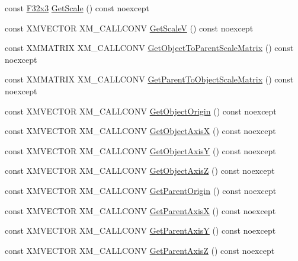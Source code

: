 \begin{DoxyCompactItemize}
\item 
const \hyperlink{namespacemage_a73fbe0da4b8d5bc156bb8453e5b63a17}{F32x3} \hyperlink{classmage_1_1_local_transform_a5dbf74dae200448b0993504d23f99f1c}{Get\+Scale} () const noexcept
\item 
const X\+M\+V\+E\+C\+T\+OR X\+M\+\_\+\+C\+A\+L\+L\+C\+O\+NV \hyperlink{classmage_1_1_local_transform_a6c70ee804326d0b5ff54d282630972bc}{Get\+ScaleV} () const noexcept
\item 
const X\+M\+M\+A\+T\+R\+IX X\+M\+\_\+\+C\+A\+L\+L\+C\+O\+NV \hyperlink{classmage_1_1_local_transform_acd4fda032325f52cb668fc4733c6bc04}{Get\+Object\+To\+Parent\+Scale\+Matrix} () const noexcept
\item 
const X\+M\+M\+A\+T\+R\+IX X\+M\+\_\+\+C\+A\+L\+L\+C\+O\+NV \hyperlink{classmage_1_1_local_transform_a81ef828c64270716e5095f2cf571fad7}{Get\+Parent\+To\+Object\+Scale\+Matrix} () const noexcept
\item 
const X\+M\+V\+E\+C\+T\+OR X\+M\+\_\+\+C\+A\+L\+L\+C\+O\+NV \hyperlink{classmage_1_1_local_transform_abaa858e23864984b339b2fa26607c026}{Get\+Object\+Origin} () const noexcept
\item 
const X\+M\+V\+E\+C\+T\+OR X\+M\+\_\+\+C\+A\+L\+L\+C\+O\+NV \hyperlink{classmage_1_1_local_transform_a369350f17dbf41afa8278643bb641125}{Get\+Object\+AxisX} () const noexcept
\item 
const X\+M\+V\+E\+C\+T\+OR X\+M\+\_\+\+C\+A\+L\+L\+C\+O\+NV \hyperlink{classmage_1_1_local_transform_accd789cb8a8f3cec2c048cfb05ef8eb3}{Get\+Object\+AxisY} () const noexcept
\item 
const X\+M\+V\+E\+C\+T\+OR X\+M\+\_\+\+C\+A\+L\+L\+C\+O\+NV \hyperlink{classmage_1_1_local_transform_a4a7a5e9b38ad3016a9f4db5c46cca782}{Get\+Object\+AxisZ} () const noexcept
\item 
const X\+M\+V\+E\+C\+T\+OR X\+M\+\_\+\+C\+A\+L\+L\+C\+O\+NV \hyperlink{classmage_1_1_local_transform_ad3577335f3be3237c89fe0b02b3cfd53}{Get\+Parent\+Origin} () const noexcept
\item 
const X\+M\+V\+E\+C\+T\+OR X\+M\+\_\+\+C\+A\+L\+L\+C\+O\+NV \hyperlink{classmage_1_1_local_transform_a211651b89d7720bf98468ea7665b74d9}{Get\+Parent\+AxisX} () const noexcept
\item 
const X\+M\+V\+E\+C\+T\+OR X\+M\+\_\+\+C\+A\+L\+L\+C\+O\+NV \hyperlink{classmage_1_1_local_transform_af53f1ef489bc5dec9d5b8ccea6e5e9bf}{Get\+Parent\+AxisY} () const noexcept
\item 
const X\+M\+V\+E\+C\+T\+OR X\+M\+\_\+\+C\+A\+L\+L\+C\+O\+NV \hyperlink{classmage_1_1_local_transform_acc8dd9207592af2db959b609bc14ae1f}{Get\+Parent\+AxisZ} () const noexcept

\end{DoxyCompactItemize}
